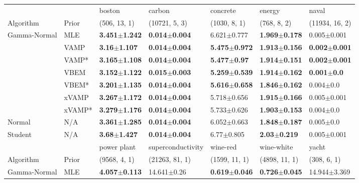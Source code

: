 \begin{tabular}{lllllll}
\toprule
        &     &                    boston &                    carbon &                  concrete &                    energy &                     naval \\
Algorithm & Prior& (506, 13, 1)& (10721, 5, 3)& (1030, 8, 1)& (768, 8, 2)& (11934, 16, 2)\\
\midrule
Gamma-Normal & MLE &  \textbf{3.451$\pm$1.242} &  \textbf{0.014$\pm$0.004} &           6.621$\pm$0.777 &  \textbf{1.969$\pm$0.178} &           0.005$\pm$0.001 \\
        & VAMP &   \textbf{3.16$\pm$1.107} &  \textbf{0.014$\pm$0.004} &  \textbf{5.475$\pm$0.972} &  \textbf{1.913$\pm$0.156} &  \textbf{0.002$\pm$0.001} \\
        & VAMP* &  \textbf{3.165$\pm$1.108} &  \textbf{0.014$\pm$0.004} &   \textbf{5.477$\pm$0.97} &  \textbf{1.914$\pm$0.151} &  \textbf{0.002$\pm$0.001} \\
        & VBEM &  \textbf{3.152$\pm$1.122} &  \textbf{0.015$\pm$0.003} &  \textbf{5.259$\pm$0.539} &  \textbf{1.914$\pm$0.162} &    \textbf{0.001$\pm$0.0} \\
        & VBEM* &  \textbf{3.201$\pm$1.135} &  \textbf{0.014$\pm$0.004} &  \textbf{5.616$\pm$0.658} &  \textbf{1.846$\pm$0.162} &             0.004$\pm$0.0 \\
        & xVAMP &  \textbf{3.267$\pm$1.172} &  \textbf{0.014$\pm$0.004} &           5.718$\pm$0.656 &  \textbf{1.915$\pm$0.166} &           0.005$\pm$0.001 \\
        & xVAMP* &  \textbf{3.279$\pm$1.176} &  \textbf{0.014$\pm$0.004} &           5.733$\pm$0.626 &  \textbf{1.903$\pm$0.153} &             0.004$\pm$0.0 \\
Normal & N/A &  \textbf{3.361$\pm$1.285} &  \textbf{0.014$\pm$0.004} &           6.052$\pm$0.663 &  \textbf{1.848$\pm$0.187} &             0.005$\pm$0.0 \\
Student & N/A &   \textbf{3.68$\pm$1.427} &  \textbf{0.014$\pm$0.004} &            6.77$\pm$0.805 &   \textbf{2.03$\pm$0.219} &           0.005$\pm$0.001 \\
\midrule
        &     &               power plant &          superconductivity &                  wine-red &                wine-white &                     yacht \\
Algorithm & Prior& (9568, 4, 1)& (21263, 81, 1)& (1599, 11, 1)& (4898, 11, 1)& (308, 6, 1)\\
\midrule
Gamma-Normal & MLE &  \textbf{4.057$\pm$0.113} &            14.641$\pm$0.26 &  \textbf{0.619$\pm$0.046} &  \textbf{0.726$\pm$0.045} &          14.944$\pm$3.369 \\

\end{tabular}
